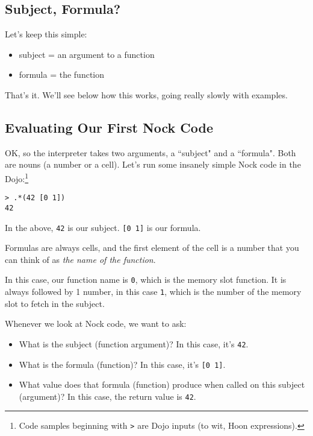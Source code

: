 \documentclass[twoside]{article}
\begin{document}
\subsection{Subject, Formula?}

Let's keep this simple:

\begin{itemize}
  \item  subject = an argument to a function
  \item  formula = the function
\end{itemize}

That's it. We'll see below how this works, going really slowly with examples.

\subsection{Evaluating Our First Nock Code}

OK, so the interpreter takes two arguments, a ``subject" and a ``formula". Both are nouns (a number or a cell). Let's run some insanely simple Nock code in the Dojo:\footnote{Code samples beginning with \lstinline[style=inlinecode]{>} are Dojo inputs (to wit, Hoon expressions).}

\begin{lstlisting}[style=listingblock]
> .*(42 [0 1])
42
\end{lstlisting}

In the above, \lstinline[style=inlinecode]{42} is our subject. \lstinline[style=inlinecode]{[0 1]} is our formula.

Formulas are always cells, and the first element of the cell is a number that you can think of as \emph{the name of the function}.

In this case, our function name is \lstinline[style=inlinecode]{0}, which is the memory slot function. It is always followed by 1 number, in this case \lstinline[style=inlinecode]{1}, which is the number of the memory slot to fetch in the subject.

Whenever we look at Nock code, we want to ask:

\begin{itemize}
  \item  What is the subject (function argument)? In this case, it's \lstinline[style=inlinecode]{42}.
  \item  What is the formula (function)? In this case, it's \lstinline[style=inlinecode]{[0 1]}.
  \item  What value does that formula (function) produce when called on this subject (argument)? In this case, the return value is \lstinline[style=inlinecode]{42}.
\end{itemize}
\end{document}
